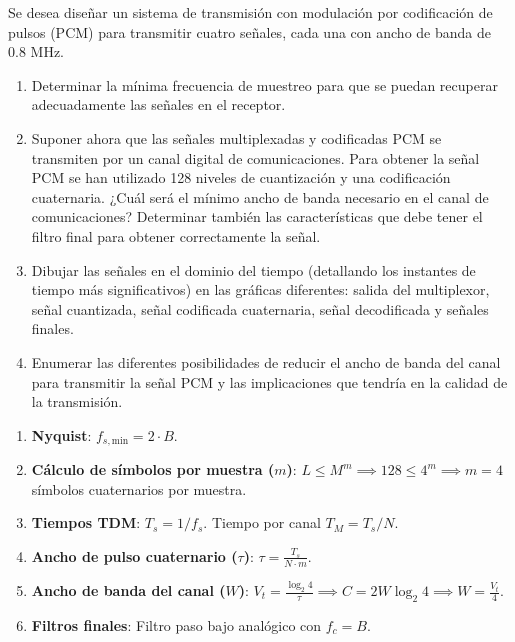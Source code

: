 \begin{problema}
Se desea diseñar un sistema de transmisión con modulación por codificación de pulsos (PCM) para transmitir cuatro señales, cada una con ancho de banda de $0.8$ MHz.
\begin{enumerate}[label=\alph*)]
    \item Determinar la mínima frecuencia de muestreo para que se puedan recuperar adecuadamente las señales en el receptor.
    \item Suponer ahora que las señales multiplexadas y codificadas PCM se transmiten por un canal digital de comunicaciones. Para obtener la señal PCM se han utilizado 128 niveles de cuantización y una codificación cuaternaria. ¿Cuál será el mínimo ancho de banda necesario en el canal de comunicaciones? Determinar también las características que debe tener el filtro final para obtener correctamente la señal.
    \item Dibujar las señales en el dominio del tiempo (detallando los instantes de tiempo más significativos) en las gráficas diferentes: salida del multiplexor, señal cuantizada, señal codificada cuaternaria, señal decodificada y señales finales.
    \item Enumerar las diferentes posibilidades de reducir el ancho de banda del canal para transmitir la señal PCM y las implicaciones que tendría en la calidad de la transmisión.
\end{enumerate}
\end{problema}

\begin{mecanizado}
\begin{enumerate}
    \item \textbf{Nyquist}: $f_{s,\text{min}} = 2 \cdot B$.
    \item \textbf{Cálculo de símbolos por muestra ($m$)}: $L \le M^m \implies 128 \le 4^m \implies m=4$ símbolos cuaternarios por muestra.
    \item \textbf{Tiempos TDM}: $T_s = 1/f_s$. Tiempo por canal $T_M = T_s / N$.
    \item \textbf{Ancho de pulso cuaternario ($\tau$)}: $\tau = \frac{T_s}{N \cdot m}$.
    \item \textbf{Ancho de banda del canal ($W$)}: $V_t = \frac{\log_2 4}{\tau} \implies C = 2 W \log_2 4 \implies W = \frac{V_t}{4}$.
    \item \textbf{Filtros finales}: Filtro paso bajo analógico con $f_c = B$.
\end{enumerate}
\end{mecanizado}

